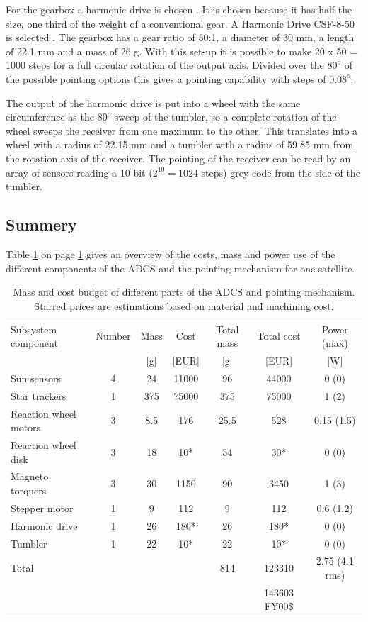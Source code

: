 For the gearbox a harmonic drive is chosen \cite{harmonicdrive}. It is chosen because it has half the size, one third of the weight of a conventional gear. A Harmonic Drive CSF-8-50 is selected \cite{harmweb}. The gearbox has a gear ratio of 50:1, a diameter of 30 mm, a length of 22.1 mm and a mass of 26 g. With this set-up it is possible to make 20 x 50 = 1000 steps for a full circular rotation of the output axis. Divided over the $80^o$ of the possible pointing options this gives a pointing capability with steps of $0.08^o$.

The output of the harmonic drive is put into a wheel with the same circumference as the $80^o$ sweep of the tumbler, so a complete rotation of the wheel sweeps the receiver from one maximum to the other. This translates into a wheel with a radius of 22.15 mm and a tumbler with a radius of 59.85 mm from the rotation axis of the receiver. The pointing of the receiver can be read by an array of sensors reading a 10-bit ($2^10 = 1024$ steps) grey code from the side of the tumbler.

\subsection{Summery}
\label{subsec:adcssum}
Table \ref{tab:adcspointbudget} on page \ref{tab:adcspointbudget} gives an overview of the costs, mass and power use of the different components of the \ac{ADCS} and the pointing mechanism for one satellite.
\begin{table}[h]
\begin{tabular}{l | c | c c | c c | c }
Subsystem component    & Number & Mass & Cost & Total mass & Total cost & Power (max)\\ 
                       &   & [g] & [EUR]& [g]  &[EUR] & [W]         \\ \hline \hline
Sun sensors            & 4 & 24  & 11000& 96   & 44000&  0 (0)      \\
Star trackers          & 1 & 375 & 75000& 375  & 75000&  1 (2)      \\ \hline
Reaction wheel motors  & 3 & 8.5 & 176  & 25.5 & 528  &  0.15 (1.5) \\
Reaction wheel disk    & 3 & 18  & 10*  & 54   & 30*  &  0 (0)      \\
Magneto torquers       & 3 & 30  & 1150 & 90   & 3450 &  1 (3)      \\ \hline
Stepper motor          & 1 & 9   & 112  & 9    & 112  &  0.6 (1.2)  \\
Harmonic drive         & 1 & 26  & 180* & 26   & 180* &  0 (0)      \\ 
Tumbler                & 1 & 22  & 10*  & 22   & 10*  &  0 (0)      \\ \hline
Total & & &                             & 814  & 123310& 2.75 (4.1 rms) \\
&&&&& 143603 FY00\$ &
\end{tabular}
\caption[Mass and cost budget ADCS and pointing]{Mass and cost budget of different parts of the \ac{ADCS} and pointing mechanism. Starred prices are estimations based on material and machining cost.}
\label{tab:adcspointbudget}
\end{table}